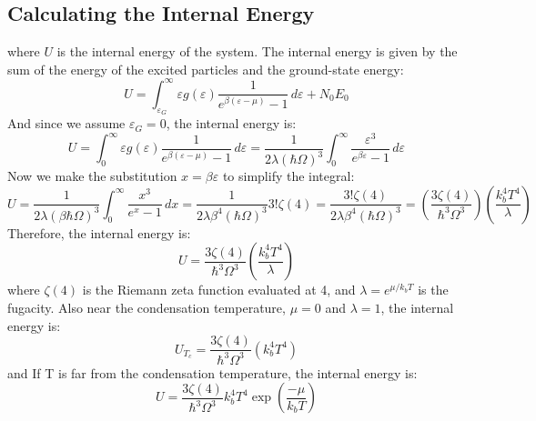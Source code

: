 \documentclass{article}
\numberwithin{equation}{section}
\numberwithin{equation}{subsection}
\begin{document}
\subsection{Calculating the Internal Energy}
where \( U \) is the internal energy of the system. The internal energy is given by the sum of the energy of the excited particles and the ground-state energy:
\begin{equation}
    U = \int_{\varepsilon_G}^{\infty} \varepsilon g(\varepsilon) \frac{1}{e^{\beta(\varepsilon - \mu)} - 1} \,d\varepsilon + N_0 E_0
\end{equation}
And since we assume $\varepsilon_G = 0$, the internal energy is:
\begin{equation}
    U = \int_{0}^{\infty} \varepsilon g(\varepsilon) \frac{1}{e^{\beta(\varepsilon - \mu)} - 1} \,d\varepsilon = \frac{1}{2\lambda(\hbar\Omega)^3} \int_{0}^{\infty} \frac{\varepsilon^3}{e^{\beta\varepsilon} - 1} \,d\varepsilon
\end{equation}
Now we make the substitution \( x = \beta\varepsilon\) to simplify the integral:
$$U = \frac{1}{2\lambda(\beta\hbar\Omega)^3} \int_{0}^{\infty} \frac{x^3}{e^x - 1} \,dx = \frac{1}{2\lambda\beta^4(\hbar\Omega)^3} 3!\zeta(4) = \frac{3!\zeta(4)}{2\lambda\beta^4(\hbar\Omega)^3} =   \left(\frac{3\zeta(4)}{\hbar^3\Omega^3}\right) \left(\frac{k_b^4T^4}{\lambda}\right) 
$$
Therefore, the internal energy is:
\begin{equation}
    U = \frac{3\zeta(4)}{\hbar^3\Omega^3} \left(\frac{k_b^4T^4}{\lambda}\right)
\end{equation}
where \( \zeta(4) \) is the Riemann zeta function evaluated at 4, and $\lambda = e^{\mu/k_bT}$ is the fugacity. Also near the condensation temperature, $\mu = 0$ and $\lambda = 1$, the internal energy is:   
\begin{equation}
    U_{T_c} = \frac{3\zeta(4)}{\hbar^3\Omega^3} \left(k_b^4T^4\right) 
\end{equation}
and If T is far from the condensation temperature, the internal energy is:
\begin{equation}
    U = \frac{3\zeta(4)}{\hbar^3\Omega^3} k_b^4T^4\exp\left(\frac{-\mu}{k_bT}\right)
\end{equation}
\end{document}
